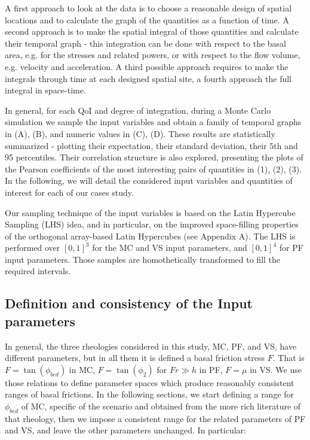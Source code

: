 \documentclass{article}
\begin{document}
A first approach to look at the data is to choose a reasonable design of spatial locations and to calculate the graph of the quantities as a function of time. A second approach is to make the spatial integral of those quantities and calculate their temporal graph - this integration can be done with respect to the basal area, e.g. for the stresses and related powers, or with respect to the flow volume, e.g. velocity and acceleration. A third possible approach requires to make the integrals through time at each designed spatial site, a fourth approach the full integral in space-time.

In general, for each QoI and degree of integration, during a Monte Carlo simulation we sample the input variables and obtain a family of temporal graphs in (A), (B), and numeric values in (C), (D). These results are statistically summarized - plotting their expectation, their standard deviation, their 5th and 95 percentiles. Their correlation structure is also explored, presenting the plots of the Pearson coefficients of the most interesting pairs of quantities in (1), (2), (3). In the following, we will detail the considered input variables and quantities of interest for each of our cases study.

Our sampling technique of the input variables is based on the Latin Hypercube Sampling (LHS) idea, and in particular, on the improved space-filling properties of the orthogonal array-based Latin Hypercubes (see Appendix A). The LHS is performed over $[0,1]^3$ for the MC and VS input parameters, and $[0,1]^4$ for PF input parameters. Those samples are homothetically transformed to fill the required intervals.

\subsection{Definition and consistency of the Input parameters}
In general, the three rheologies considered in this study, MC, PF, and VS, have different parameters, but in all them it is defined a basal friction stress $F$. That is $F=\tan(\phi_{bed})$ in MC, $F=\tan(\phi_2)$ for $Fr\gg h$ in PF, $F=\mu$ in VS. We use those relations to define parameter spaces which produce reasonably consistent ranges of basal frictions. In the following sections, we start defining a range for $\phi_{bed}$ of MC, specific of the scenario and obtained from the more rich literature of that rheology, then we impose a consistent range for the related parameters of PF and VS, and leave the other parameters unchanged. In particular:
\end{document}
